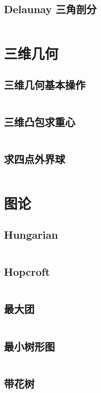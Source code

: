 \documentclass[titlepage,landscape,a4paper,10pt]{article}
\begin{document}
\begin{multicols}{2}
\begin{spacing}{0.8}
\subsection{Delaunay 三角剖分}
\inputminted{cpp}{improve/DelaunayTriangulation.cpp}

\section{三维几何}

\subsection{三维几何基本操作}
\inputminted{cpp}{merge/3DGeo.cpp}

\subsection{三维凸包求重心}
\inputminted{cpp}{src/三维凸包.cpp}

\subsection{求四点外界球}
\inputminted{cpp}{src/最小覆盖球.cpp}

\section{图论}

\subsection{Hungarian}
\inputminted{cpp}{improve/Hungarian.cpp}

\subsection{Hopcroft}
\inputminted{cpp}{src/Hopcroft.cpp}

\subsection{最大团}
\inputminted{cpp}{improve/MaximumClique.cpp}

\subsection{最小树形图}
\inputminted{cpp}{improve/LiuZhu.cpp}

\subsection{带花树}
\inputminted{cpp}{src/带花树.cpp}


\end{spacing}
\end{multicols}
\end{document}
